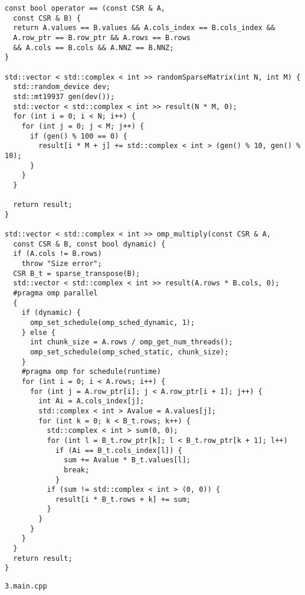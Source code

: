 \documentclass{report}
\begin{document}
\begin{lstlisting}
const bool operator == (const CSR & A,
  const CSR & B) {
  return A.values == B.values && A.cols_index == B.cols_index &&
  A.row_ptr == B.row_ptr && A.rows == B.rows
  && A.cols == B.cols && A.NNZ == B.NNZ;
}

std::vector < std::complex < int >> randomSparseMatrix(int N, int M) {
  std::random_device dev;
  std::mt19937 gen(dev());
  std::vector < std::complex < int >> result(N * M, 0);
  for (int i = 0; i < N; i++) {
    for (int j = 0; j < M; j++) {
      if (gen() % 100 == 0) {
        result[i * M + j] += std::complex < int > (gen() % 10, gen() % 10);
      }
    }
  }

  return result;
}

std::vector < std::complex < int >> omp_multiply(const CSR & A,
  const CSR & B, const bool dynamic) {
  if (A.cols != B.rows)
    throw "Size error";
  CSR B_t = sparse_transpose(B);
  std::vector < std::complex < int >> result(A.rows * B.cols, 0);
  #pragma omp parallel
  {
    if (dynamic) {
      omp_set_schedule(omp_sched_dynamic, 1);
    } else {
      int chunk_size = A.rows / omp_get_num_threads();
      omp_set_schedule(omp_sched_static, chunk_size);
    }
    #pragma omp for schedule(runtime)
    for (int i = 0; i < A.rows; i++) {
      for (int j = A.row_ptr[i]; j < A.row_ptr[i + 1]; j++) {
        int Ai = A.cols_index[j];
        std::complex < int > Avalue = A.values[j];
        for (int k = 0; k < B_t.rows; k++) {
          std::complex < int > sum(0, 0);
          for (int l = B_t.row_ptr[k]; l < B_t.row_ptr[k + 1]; l++)
            if (Ai == B_t.cols_index[l]) {
              sum += Avalue * B_t.values[l];
              break;
            }
          if (sum != std::complex < int > (0, 0)) {
            result[i * B_t.rows + k] += sum;
          }
        }
      }
    }
  }
  return result;
}
\end{lstlisting}
\par \verb|3.main.cpp|
\end{document}
